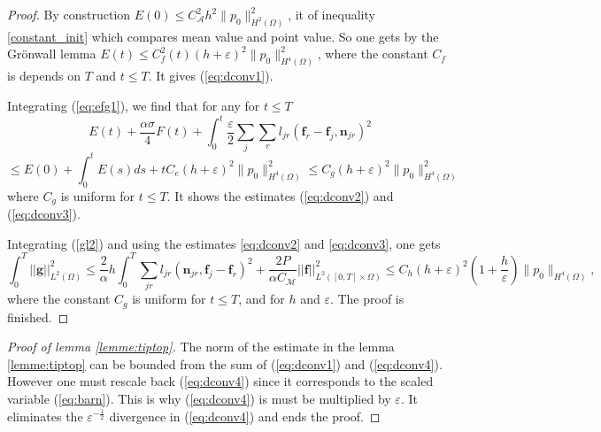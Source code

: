 \documentclass[a4paper,french,english,10pt]{article}
\newcommand\ljr{l_{jr}}
\newcommand\njr{\mathbf{n}_{jr}}
\newcommand\eps{\varepsilon}
\newcommand\fj{\mathbf{f}_j}
\newcommand\fr{\mathbf{f}_r}
\newcommand\ff{\mathbf{f}}
\newcommand\gf{\mathbf{g}}
\begin{document}
\begin{proof}
By construction $E(0)\leq C_\mathcal A^2h^2\| p_0\|_{H^2(\Omega)}^2$, it 
 of inequality  \eqref{constant_init} which compares mean value and point
value.
 So one gets by the Gr\"onwall lemma
$
E(t)\leq C_f ^2(t) (h+\eps)^2 \|    p_0  \|_{H^4(\Omega)}^2
$, where the constant $C_f$ is depends on $T$ and $t\leq T$.
 It gives (\ref{eq:dconv1}).

Integrating  (\ref{eq:efg1}),  we find that for any 
for $t\leq T$
$$
E(t)+  \frac{\alpha \sigma }{4}  F(t)+\int_0^t \frac{\eps}{2}\sum_j\sum_r \ljr \left(
\fr- \fj,  \njr\right )^2
$$
$$
\leq
 E(0)+ \int_0^t  E(s) ds 
 + t 
 C_e (h+\varepsilon)^2 \|    p_0  \|_{H^4(\Omega)}^2
\leq  C_g  (h+\varepsilon)^2 \|    p_0  \|_{H^4(\Omega)}^2
$$
where $C_g$ is uniform for $t\leq T$.
It shows   
the  estimates (\ref{eq:dconv2}) and (\ref{eq:dconv3}).

Integrating  (\ref{gl2}) and using the estimates \eqref{eq:dconv2} and \eqref{eq:dconv3}, one gets
\begin{equation*}\label{gl3}
\int_0^T \vert\vert\gf \vert\vert^2_{L^2(\Omega)} \leq 
\frac{2}{\alpha} h \int_0^T\sum_{jr}\ljr(\njr,\fj-\fr)^2 +  \frac{2P}{\alpha C_\mathcal M} \vert\vert\ff \vert\vert^2_{L^2([0,T]\times\Omega)}
\leq
C_h (h+\eps)^2(1+\frac h\eps) \|    p_0  \|_{H^4(\Omega)},
\end{equation*}
where the constant $C_g$ is uniform for $t\leq T$, and for $h$ and $\varepsilon$.
 The proof is finished.
\end{proof}

\begin{proof}[Proof of lemma \ref{lemme:tiptop}]
The norm of the estimate in the lemma  \ref{lemme:tiptop} can be bounded 
from   the sum of (\ref{eq:dconv1}) and (\ref{eq:dconv4}).
However one must rescale  back (\ref{eq:dconv4}) since it corresponds to the scaled variable
(\ref{eq:barn}). This is why (\ref{eq:dconv4}) is must be multiplied by $\varepsilon$. It eliminates the 
$\varepsilon^{-\frac12}$
divergence in (\ref{eq:dconv4})  and ends the proof.
\end{proof}
\end{document}
